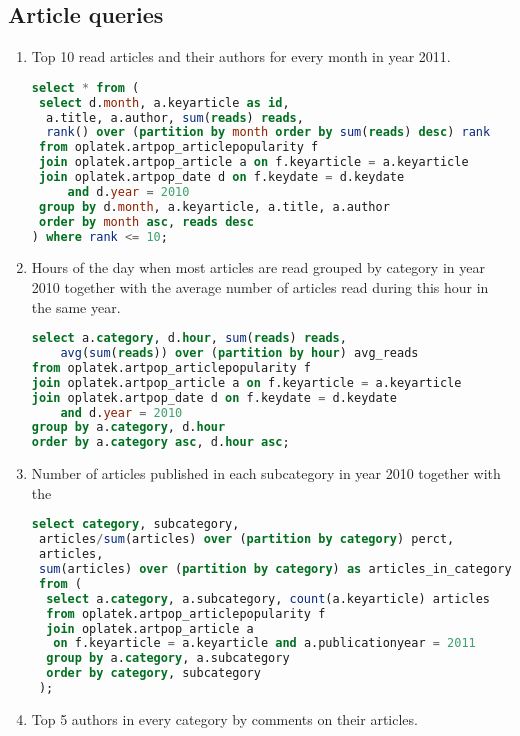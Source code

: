 \subsection*{Article queries} %
\label{sub:Article  queries}
\begin{enumerate}
\item    Top 10 read articles and their authors for every month in year 2011.
\begin{lstlisting}[language=sql] 
select * from (
 select d.month, a.keyarticle as id, 
  a.title, a.author, sum(reads) reads, 
  rank() over (partition by month order by sum(reads) desc) rank 
 from oplatek.artpop_articlepopularity f
 join oplatek.artpop_article a on f.keyarticle = a.keyarticle
 join oplatek.artpop_date d on f.keydate = d.keydate 
     and d.year = 2010
 group by d.month, a.keyarticle, a.title, a.author
 order by month asc, reads desc
) where rank <= 10;
\end{lstlisting}
\item    Hours of the day when most articles are read grouped by category in year 2010 together with the average number of articles read during this hour in the same year.
\begin{lstlisting}[language=sql] 
select a.category, d.hour, sum(reads) reads, 
    avg(sum(reads)) over (partition by hour) avg_reads 
from oplatek.artpop_articlepopularity f
join oplatek.artpop_article a on f.keyarticle = a.keyarticle
join oplatek.artpop_date d on f.keydate = d.keydate 
    and d.year = 2010
group by a.category, d.hour
order by a.category asc, d.hour asc;
\end{lstlisting}
\item    Number of articles published in each subcategory in year 2010 together with the %
\begin{lstlisting}[language=sql] 
select category, subcategory, 
 articles/sum(articles) over (partition by category) perct, 
 articles, 
 sum(articles) over (partition by category) as articles_in_category 
 from (
  select a.category, a.subcategory, count(a.keyarticle) articles
  from oplatek.artpop_articlepopularity f
  join oplatek.artpop_article a 
   on f.keyarticle = a.keyarticle and a.publicationyear = 2011
  group by a.category, a.subcategory
  order by category, subcategory
 );
\end{lstlisting}
\item    Top 5 authors in every category by comments on their articles.
\begin{lstlisting}[language=sql] 

\end{lstlisting}
\end{enumerate}
